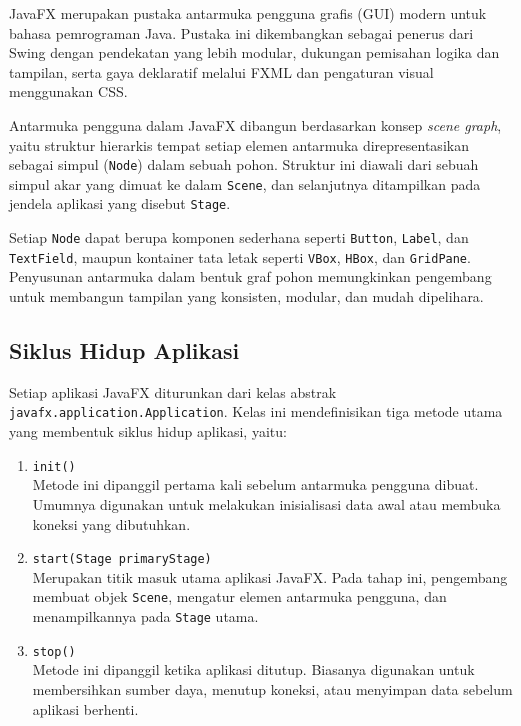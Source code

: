 
JavaFX merupakan pustaka antarmuka pengguna grafis (GUI) modern untuk bahasa pemrograman Java. Pustaka ini dikembangkan sebagai penerus dari Swing dengan pendekatan yang lebih modular, dukungan pemisahan logika dan tampilan, serta gaya deklaratif melalui FXML dan pengaturan visual menggunakan CSS. 

Antarmuka pengguna dalam JavaFX dibangun berdasarkan konsep \textit{scene graph}, yaitu struktur hierarkis tempat setiap elemen antarmuka direpresentasikan sebagai simpul (\texttt{Node}) dalam sebuah pohon. Struktur ini diawali dari sebuah simpul akar yang dimuat ke dalam \texttt{Scene}, dan selanjutnya ditampilkan pada jendela aplikasi yang disebut \texttt{Stage}. 

Setiap \texttt{Node} dapat berupa komponen sederhana seperti \texttt{Button}, \texttt{Label}, dan \texttt{TextField}, maupun kontainer tata letak seperti \texttt{VBox}, \texttt{HBox}, dan \texttt{GridPane}. Penyusunan antarmuka dalam bentuk graf pohon memungkinkan pengembang untuk membangun tampilan yang konsisten, modular, dan mudah dipelihara.


\subsection{Siklus Hidup Aplikasi}
Setiap aplikasi JavaFX diturunkan dari kelas abstrak \texttt{javafx.application.Application}. Kelas ini mendefinisikan tiga metode utama yang membentuk siklus hidup aplikasi, yaitu:  

\begin{enumerate}
    \item \texttt{init()}\\
    Metode ini dipanggil pertama kali sebelum antarmuka pengguna dibuat. Umumnya digunakan untuk melakukan inisialisasi data awal atau membuka koneksi yang dibutuhkan.  

    \item \texttt{start(Stage primaryStage)}\\
    Merupakan titik masuk utama aplikasi JavaFX. Pada tahap ini, pengembang membuat objek \texttt{Scene}, mengatur elemen antarmuka pengguna, dan menampilkannya pada \texttt{Stage} utama.  

    \item \texttt{stop()}\\
    Metode ini dipanggil ketika aplikasi ditutup. Biasanya digunakan untuk membersihkan sumber daya, menutup koneksi, atau menyimpan data sebelum aplikasi berhenti.  
\end{enumerate}

